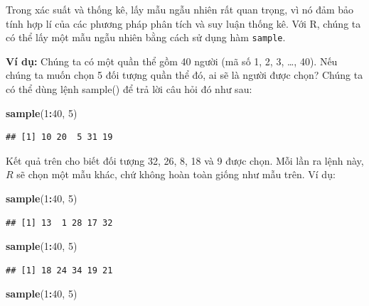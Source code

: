 \documentclass[
]{book}
\newenvironment{Shaded}{\begin{snugshade}}{\end{snugshade}}
\newcommand{\DecValTok}[1]{\textcolor[rgb]{0.00,0.00,0.81}{#1}}
\newcommand{\KeywordTok}[1]{\textcolor[rgb]{0.13,0.29,0.53}{\textbf{#1}}}
\newcommand{\NormalTok}[1]{#1}
\newcommand{\OperatorTok}[1]{\textcolor[rgb]{0.81,0.36,0.00}{\textbf{#1}}}
\begin{document}
Trong xác suất và thống kê, lấy mẫu ngẫu nhiên rất quan trọng, vì nó đảm bảo tính hợp lí của các phương pháp phân tích và suy luận thống kê. Với R, chúng ta có thể lấy một mẫu ngẫu nhiên bằng cách sử dụng hàm \texttt{sample}.

\textbf{Ví dụ:} Chúng ta có một quần thể gồm 40 người (mã số 1, 2, 3, \ldots, 40). Nếu chúng ta muốn chọn 5 đối tượng quần thể đó, ai sẽ là người được chọn? Chúng ta có thể dùng lệnh sample() để trả lời câu hỏi đó như sau:

\begin{Shaded}
\begin{Highlighting}[]
\KeywordTok{sample}\NormalTok{(}\DecValTok{1}\OperatorTok{:}\DecValTok{40}\NormalTok{, }\DecValTok{5}\NormalTok{)}
\end{Highlighting}
\end{Shaded}

\begin{verbatim}
## [1] 10 20  5 31 19
\end{verbatim}

Kết quả trên cho biết đối tượng 32, 26, 8, 18 và 9 được chọn. Mỗi lần ra lệnh này, \(R\) sẽ chọn một mẫu khác, chứ không hoàn toàn giống như mẫu trên. Ví dụ:

\begin{Shaded}
\begin{Highlighting}[]
\KeywordTok{sample}\NormalTok{(}\DecValTok{1}\OperatorTok{:}\DecValTok{40}\NormalTok{, }\DecValTok{5}\NormalTok{)}
\end{Highlighting}
\end{Shaded}

\begin{verbatim}
## [1] 13  1 28 17 32
\end{verbatim}

\begin{Shaded}
\begin{Highlighting}[]
\KeywordTok{sample}\NormalTok{(}\DecValTok{1}\OperatorTok{:}\DecValTok{40}\NormalTok{, }\DecValTok{5}\NormalTok{)}
\end{Highlighting}
\end{Shaded}

\begin{verbatim}
## [1] 18 24 34 19 21
\end{verbatim}

\begin{Shaded}
\begin{Highlighting}[]
\KeywordTok{sample}\NormalTok{(}\DecValTok{1}\OperatorTok{:}\DecValTok{40}\NormalTok{, }\DecValTok{5}\NormalTok{)}
\end{Highlighting}
\end{Shaded}
\end{document}
